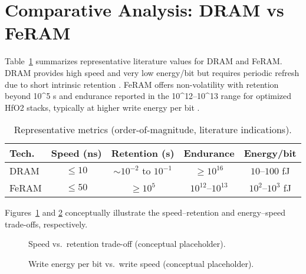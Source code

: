 \section{Comparative Analysis: DRAM vs FeRAM}
\label{sec:comparison}

Table~\ref{tab:comparison} summarizes representative literature values for DRAM and FeRAM. DRAM provides high speed and very low energy/bit but requires periodic refresh due to short intrinsic retention \cite{choi2022,kim2021_dram,iedm2023_dram}. FeRAM offers non-volatility with retention beyond 10^5 s and endurance reported in the 10^{12}--10^{13} range for optimized HfO2 stacks, typically at higher write energy per bit \cite{boscke2011,mueller2012,noheda2023,martin2020}.

\begin{table}[!t]
\centering
\caption{Representative metrics (order-of-magnitude, literature indications).}
\label{tab:comparison}
\begin{tabular}{lcccc}
\toprule
Tech. & Speed (ns) & Retention (s) & Endurance & Energy/bit \\
\midrule
DRAM  & $\le 10$  & $\sim 10^{-2}$ to $10^{-1}$ & $\ge 10^{16}$ & $10$--$100$ fJ \\
FeRAM & $\le 50$  & $\ge 10^{5}$                & $10^{12}$--$10^{13}$ & $10^{2}$--$10^{3}$ fJ \\
\bottomrule
\end{tabular}
\end{table}

Figures~\ref{fig:speed_retention} and \ref{fig:energy_speed} conceptually illustrate the speed--retention and energy--speed trade-offs, respectively.

\begin{figure}[!t]
  \centering
  \fbox{\rule{0pt}{45mm}\rule{0.95\linewidth}{0pt}}
  \caption{Speed vs.\ retention trade-off (conceptual placeholder).}
  \label{fig:speed_retention}
\end{figure}

\begin{figure}[!t]
  \centering
  \fbox{\rule{0pt}{45mm}\rule{0.95\linewidth}{0pt}}
  \caption{Write energy per bit vs.\ write speed (conceptual placeholder).}
  \label{fig:energy_speed}
\end{figure}
